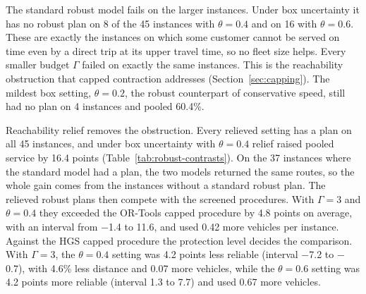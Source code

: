 The standard robust model fails on the larger instances. Under box uncertainty it has no robust plan on 8 of the 45 instances with $\theta=0.4$ and on 16 with $\theta=0.6$. These are exactly the instances on which some customer cannot be served on time even by a direct trip at its upper travel time, so no fleet size helps. Every smaller budget $\Gamma$ failed on exactly the same instances. This is the reachability obstruction that capped contraction addresses (Section~\ref{sec:capping}). The mildest box setting, $\theta=0.2$, the robust counterpart of conservative speed, still had no plan on 4 instances and pooled 60.4\%.

Reachability relief removes the obstruction. Every relieved setting has a plan on all 45 instances, and under box uncertainty with $\theta=0.4$ relief raised pooled service by 16.4 points (Table~\ref{tab:robust-contrasts}). On the 37 instances where the standard model had a plan, the two models returned the same routes, so the whole gain comes from the instances without a standard robust plan. The relieved robust plans then compete with the screened procedures. With $\Gamma=3$ and $\theta=0.4$ they exceeded the OR-Tools capped procedure by 4.8 points on average, with an interval from $-$1.4 to 11.6, and used 0.42 more vehicles per instance. Against the HGS capped procedure the protection level decides the comparison. With $\Gamma=3$, the $\theta=0.4$ setting was 4.2 points less reliable (interval $-$7.2 to $-$0.7), with 4.6\% less distance and 0.07 more vehicles, while the $\theta=0.6$ setting was 4.2 points more reliable (interval 1.3 to 7.7) and used 0.67 more vehicles.

